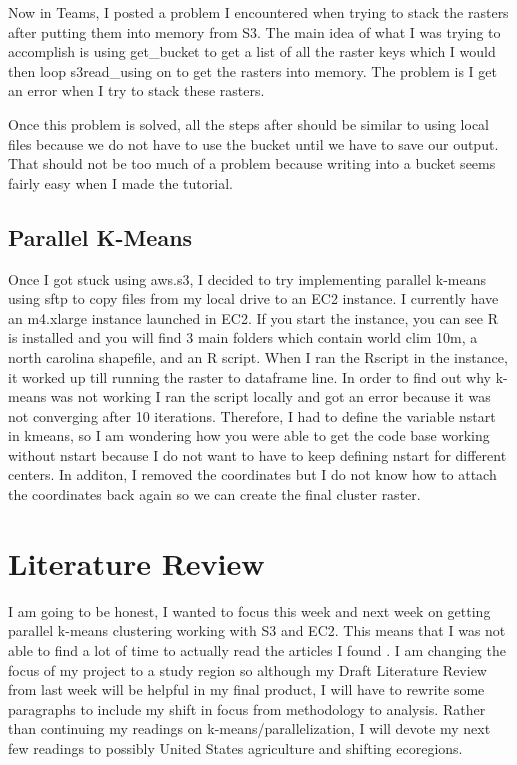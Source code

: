\documentclass[a4paper,10pt]{article}
\begin{document}
Now in Teams, I posted a problem I encountered when trying to stack the rasters after putting them into memory from S3. The main idea of what I was trying to accomplish is using get\_bucket to get a list of all the raster keys which I would then loop s3read\_using on to get the rasters into memory. The problem is I get an error when I try to stack these rasters.

Once this problem is solved, all the steps after should be similar to using local files because we do not have to use the bucket until we have to save our output. That should not be too much of a problem because writing into a bucket seems fairly easy when I made the tutorial.

\subsection{Parallel K-Means}
Once I got stuck using aws.s3, I decided to try implementing parallel k-means using sftp to copy files from my local drive to an EC2 instance. I currently have an m4.xlarge instance launched in EC2. If you start the instance, you can see R is installed and you will find 3 main folders which contain world clim 10m, a north carolina shapefile, and an R script. When I ran the Rscript in the instance, it worked up till running the raster to dataframe line. In order to find out why k-means was not working I ran the script locally and got an error because it was not converging after 10 iterations. Therefore, I had to define the variable nstart in kmeans, so I am wondering how you were able to get the code base working without nstart because I do not want to have to keep defining nstart for different centers. In additon, I removed the coordinates but I do not know how to attach the coordinates back again so we can create the final cluster raster.

\section{Literature Review}
I am going to be honest, I wanted to focus this week and next week on getting parallel k-means clustering working with S3 and EC2. This means that I was not able to find a lot of time to actually read the articles I found \cite{havstad2018vulnerabilities, kroodsma2006carbon, lobell2011climate, reilly2003us}. I am changing the focus of my project to a study region so although my Draft Literature Review from last week will be helpful in my final product, I will have to rewrite some paragraphs to include my shift in focus from methodology to analysis. Rather than continuing my readings on k-means/parallelization, I will devote my next few readings to possibly United States agriculture and shifting ecoregions.
\end{document}

